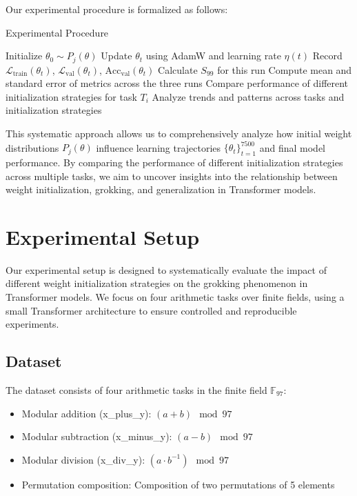 \documentclass{article} %
\begin{document}
Our experimental procedure is formalized as follows:

\begin{algorithm}
\caption{Experimental Procedure}
\begin{algorithmic}[1]
         
            \State Initialize $\theta_0 \sim P_j(\theta)$
             
                \State Update $\theta_t$ using AdamW and learning rate $\eta(t)$
                \State Record $\mathcal{L}_{\text{train}}(\theta_t)$, $\mathcal{L}_{\text{val}}(\theta_t)$, $\text{Acc}_{\text{val}}(\theta_t)$
            \EndFor
            \State Calculate $S_{99}$ for this run
        \EndFor
        \State Compute mean and standard error of metrics across the three runs
    \EndFor
    \State Compare performance of different initialization strategies for task $T_i$
\EndFor
\State Analyze trends and patterns across tasks and initialization strategies
\end{algorithmic}
\end{algorithm}

This systematic approach allows us to comprehensively analyze how initial weight distributions $P_j(\theta)$ influence learning trajectories $\{\theta_t\}_{t=1}^{7500}$ and final model performance. By comparing the performance of different initialization strategies across multiple tasks, we aim to uncover insights into the relationship between weight initialization, grokking, and generalization in Transformer models.

\section{Experimental Setup}
\label{sec:experimental}

Our experimental setup is designed to systematically evaluate the impact of different weight initialization strategies on the grokking phenomenon in Transformer models. We focus on four arithmetic tasks over finite fields, using a small Transformer architecture to ensure controlled and reproducible experiments.

\subsection{Dataset}
The dataset consists of four arithmetic tasks in the finite field $\mathbb{F}_{97}$:
\begin{itemize}
    \item Modular addition (x\_plus\_y): $(a + b) \mod 97$
    \item Modular subtraction (x\_minus\_y): $(a - b) \mod 97$
    \item Modular division (x\_div\_y): $(a \cdot b^{-1}) \mod 97$
    \item Permutation composition: Composition of two permutations of 5 elements
\end{itemize}
\end{document}
